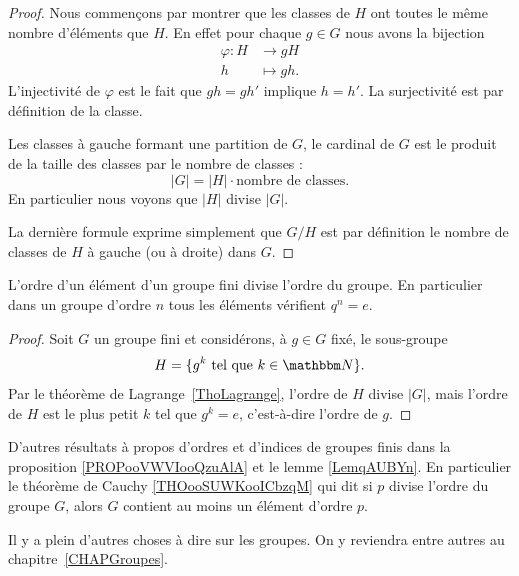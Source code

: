 \begin{proof}
    Nous commençons par montrer que les classes de \( H\) ont toutes le même nombre d'éléments que \( H\). En effet pour chaque \( g\in G\) nous avons la bijection
    \begin{equation}
        \begin{aligned}
            \varphi\colon H&\to gH \\
            h&\mapsto gh.
        \end{aligned}
    \end{equation}
    L'injectivité de \( \varphi\) est le fait que \( gh=gh'\) implique \( h=h'\). La surjectivité est par définition de la classe.

    Les classes à gauche formant une partition de \( G\), le cardinal de \( G\) est le produit de la taille des classes par le nombre de classes :
    \begin{equation}
        | G |=| H |\cdot\text{nombre de classes}.
    \end{equation}
    En particulier nous voyons que \( | H |\) divise \( | G |\).

    La dernière formule exprime simplement que \( G/H\) est par définition le nombre de classes de \( H\) à gauche (ou à droite) dans \( G\).
\end{proof}

\begin{corollary}       \label{CorpZItFX}
    L'ordre d'un élément d'un groupe fini divise l'ordre du groupe. En particulier dans un groupe d'ordre \( n\) tous les éléments vérifient \( q^n=e\).
\end{corollary}

\begin{proof}
    Soit \( G\) un groupe fini et considérons, à \( g \in G \) fixé, le sous-groupe
    \begin{equation}
        H=\{ g^k\tq k\in\eN \}.
    \end{equation}
    Par le théorème de Lagrange~\ref{ThoLagrange}, l'ordre de \( H\) divise \( | G |\), mais l'ordre de \( H\) est le plus petit \( k\) tel que \( g^k=e\), c'est-à-dire l'ordre de \( g\).
\end{proof}

D'autres résultats à propos d'ordres et d'indices de groupes finis dans la proposition \ref{PROPooVWVIooQzuAlA} et le lemme \ref{LemqAUBYn}. En particulier le théorème de Cauchy \ref{THOooSUWKooICbzqM} qui dit si \( p\) divise l'ordre du groupe \( G\), alors \( G\) contient au moins un élément d'ordre \( p\).


Il y a plein d'autres choses à dire sur les groupes. On y reviendra entre autres au chapitre~\ref{CHAPGroupes}.
